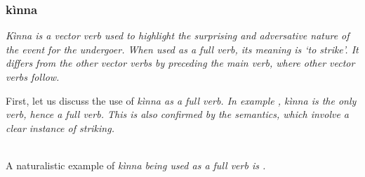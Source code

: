 \subsubsection{kìnna}\label{sec:wc:vv:kinna}
\em Kìnna \em is a vector verb used to highlight the surprising and adversative nature of the event for the undergoer. When used as a full verb, its meaning is `to strike'. It differs from the other vector verbs by preceding the main verb, where other vector verbs follow.

First, let us discuss the use of \em kìnna \em as a full verb. In example , \em kìnna \em is the only verb, hence a full verb.   This is also confirmed by the  semantics, which involve a clear instance of striking.

 \\
A  naturalistic example of \em kìnna \em being used as a full verb is .

\\ 




% 
%  




